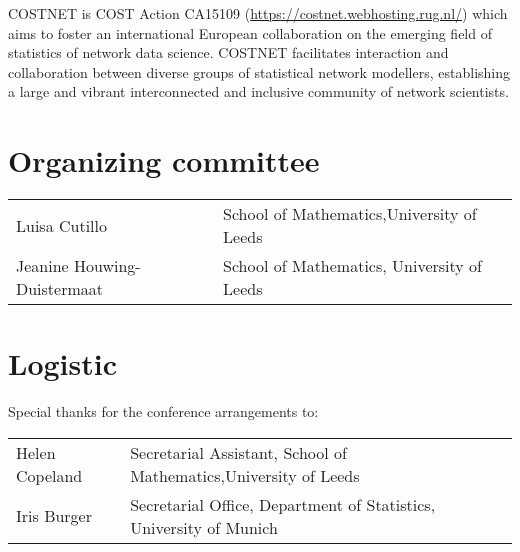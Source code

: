 COSTNET is COST Action CA15109 (\url{https://costnet.webhosting.rug.nl/}) which aims to foster an international European collaboration on the emerging field of statistics of network data science. COSTNET facilitates interaction and collaboration between diverse groups of statistical network modellers, establishing a large and vibrant interconnected and inclusive community of network scientists. 



\section{Organizing committee}
\begin{center}
\begin{tabular}{ll}
Luisa Cutillo & School of Mathematics,University of Leeds\\
Jeanine Houwing-Duistermaat & School of Mathematics, University of Leeds


\end{tabular}
\end{center}
\section{Logistic}
Special thanks for the conference arrangements to:
\begin{center}
\begin{tabular}{ll}
Helen Copeland & Secretarial Assistant, School of Mathematics,University of Leeds\\
Iris Burger & Secretarial Office, Department of Statistics, University of Munich\\ 

\end{tabular}
\end{center}

